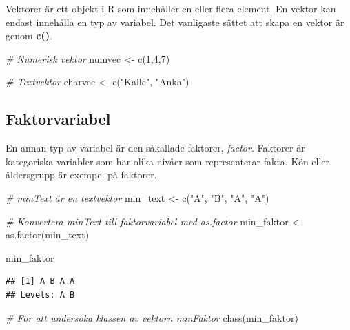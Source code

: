 \documentclass[
]{book}
\newenvironment{Shaded}{\begin{snugshade}}{\end{snugshade}}
\newcommand{\CommentTok}[1]{\textcolor[rgb]{0.56,0.35,0.01}{\textit{#1}}}
\newcommand{\DecValTok}[1]{\textcolor[rgb]{0.00,0.00,0.81}{#1}}
\newcommand{\FunctionTok}[1]{\textcolor[rgb]{0.00,0.00,0.00}{#1}}
\newcommand{\NormalTok}[1]{#1}
\newcommand{\OtherTok}[1]{\textcolor[rgb]{0.56,0.35,0.01}{#1}}
\newcommand{\StringTok}[1]{\textcolor[rgb]{0.31,0.60,0.02}{#1}}
\begin{document}
Vektorer är ett objekt i R som innehåller en eller flera element. En vektor kan endast innehålla en typ av variabel. Det vanligaste sättet att skapa en vektor är genom \textbf{c()}.

\begin{Shaded}
\begin{Highlighting}[]
\CommentTok{\# Numerisk vektor}
\NormalTok{numvec }\OtherTok{\textless{}{-}} \FunctionTok{c}\NormalTok{(}\DecValTok{1}\NormalTok{,}\DecValTok{4}\NormalTok{,}\DecValTok{7}\NormalTok{)}

\CommentTok{\# Textvektor}
\NormalTok{charvec }\OtherTok{\textless{}{-}} \FunctionTok{c}\NormalTok{(}\StringTok{"Kalle"}\NormalTok{, }\StringTok{"Anka"}\NormalTok{)}
\end{Highlighting}
\end{Shaded}

\hypertarget{faktorvariabel}{%
\subsection{Faktorvariabel}\label{faktorvariabel}}

En annan typ av variabel är den såkallade faktorer, \emph{factor}. Faktorer är kategoriska variabler som har olika nivåer som representerar fakta. Kön eller åldersgrupp är exempel på faktorer.

\begin{Shaded}
\begin{Highlighting}[]
\CommentTok{\# minText är en textvektor}
\NormalTok{min\_text }\OtherTok{\textless{}{-}} \FunctionTok{c}\NormalTok{(}\StringTok{"A"}\NormalTok{, }\StringTok{"B"}\NormalTok{, }\StringTok{"A"}\NormalTok{, }\StringTok{"A"}\NormalTok{)}

\CommentTok{\# Konvertera minText till faktorvariabel med as.factor}
\NormalTok{min\_faktor }\OtherTok{\textless{}{-}} \FunctionTok{as.factor}\NormalTok{(min\_text)}

\NormalTok{min\_faktor}
\end{Highlighting}
\end{Shaded}

\begin{verbatim}
## [1] A B A A
## Levels: A B
\end{verbatim}

\begin{Shaded}
\begin{Highlighting}[]
\CommentTok{\# För att undersöka klassen av vektorn minFaktor}
\FunctionTok{class}\NormalTok{(min\_faktor)}
\end{Highlighting}
\end{Shaded}
\end{document}
